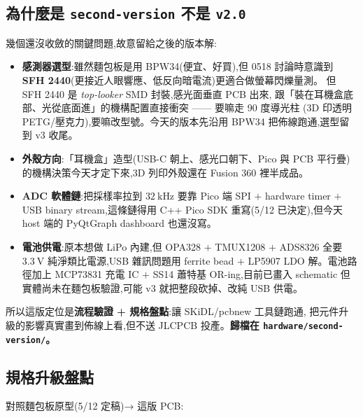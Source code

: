 \subsection*{為什麼是 \texttt{second-version} 不是 \texttt{v2.0}}

幾個還沒收斂的關鍵問題,故意留給之後的版本解:

\begin{itemize}[leftmargin=2em,itemsep=0pt]
  \item \textbf{感測器選型}:雖然麵包板是用 BPW34(便宜、好買),但 0518 討論時意識到
        \textbf{SFH 2440}(更接近人眼響應、低反向暗電流)更適合做螢幕閃爍量測。
        但 SFH 2440 是 \emph{top-looker} SMD 封裝,感光面垂直 PCB 出來,
        跟「裝在耳機盒底部、光從底面進」的機構配置直接衝突 —— 要嘛走 90 度導光柱
        (3D 印透明 PETG/壓克力),要嘛改型號。今天的版本先沿用 BPW34
        把佈線跑通,選型留到 v3 收尾。
  \item \textbf{外殼方向}:「耳機盒」造型(USB-C 朝上、感光口朝下、Pico 與 PCB 平行疊)
        的機構決策今天才定下來,3D 列印外殼還在 Fusion 360 裡半成品。
  \item \textbf{ADC 軟體鏈}:把採樣率拉到 \(\SI{32}{\kilo\hertz}\) 要靠 Pico 端
        SPI \(+\) hardware timer \(+\) USB binary stream,這條鏈得用 C++ Pico SDK
        重寫(5/12 已決定),但今天 host 端的 PyQtGraph dashboard 也還沒寫。
  \item \textbf{電池供電}:原本想做 LiPo 內建,但 OPA328 \(+\) TMUX1208 \(+\) ADS8326
        全要 \(\SI{3.3}{\volt}\) 純淨類比電源,USB 雜訊問題用 ferrite bead \(+\) LP5907 LDO
        解。電池路徑加上 MCP73831 充電 IC \(+\) SS14 蕭特基 OR-ing,目前已畫入 schematic
        但實體尚未在麵包板驗證,可能 v3 就把整段砍掉、改純 USB 供電。
\end{itemize}

所以這版定位是\textbf{流程驗證 + 規格盤點}:讓 SKiDL/pcbnew 工具鏈跑通,
把元件升級的影響真實畫到佈線上看,但不送 JLCPCB 投產。\textbf{歸檔在
\texttt{hardware/second-version/}。}

\subsection*{規格升級盤點}

對照麵包板原型(5/12 定稿)→ 這版 PCB:

